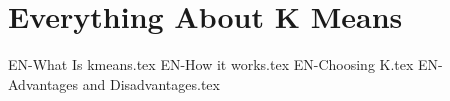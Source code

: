 \chapterspaceabove{6.75cm} %
\chapterspacebelow{7.25cm} %


\chapter{Everything About K Means}

{EN-What Is kmeans.tex}
{EN-How it works.tex}
{EN-Choosing K.tex}
{EN-Advantages and Disadvantages.tex}


